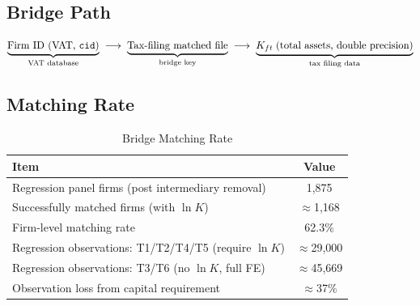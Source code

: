 \documentclass[12pt]{article}
\begin{document}
\subsection*{Bridge Path}

\[
  \underbrace{\text{Firm ID (VAT, \texttt{cid})}}_{\text{VAT database}}
  \;\longrightarrow\;
  \underbrace{\text{Tax-filing matched file}}_{\text{bridge key}}
  \;\longrightarrow\;
  \underbrace{K_{ft}\;(\text{total assets, double precision})}_{\text{tax filing data}}
\]

\subsection*{Matching Rate}

\begin{table}[H]
  \centering
  \caption{Bridge Matching Rate}
  \label{tab:match_rate}
  \begin{threeparttable}
    \begin{tabular}{lc}
      \toprule
      Item & Value \\
      \midrule
      Regression panel firms (post intermediary removal) & 1,875 \\
      Successfully matched firms (with \(\ln K\))        & $\approx$1,168 \\
      Firm-level matching rate                           & 62.3\% \\
      \midrule
      Regression observations: T1/T2/T4/T5 (require \(\ln K\)) & $\approx$29,000 \\
      Regression observations: T3/T6 (no \(\ln K\), full FE) & $\approx$45,669 \\
      Observation loss from capital requirement & $\approx$37\% \\
      \bottomrule
    \end{tabular}
  \end{threeparttable}
\end{table}
\end{document}
